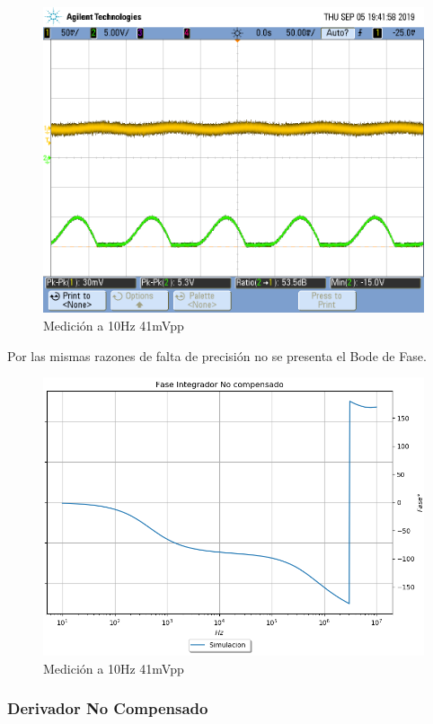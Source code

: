 \documentclass[a4paper]{article}
\begin{document}
\begin{figure}[H]
	\centering
	\includegraphics[width=\textwidth]{Ejercicio4/FOTOS-TP2-TC-EJ4/piso}
	\caption{Medición a 10Hz 41mVpp}
\end{figure}

Por las mismas razones de falta de precisión no se presenta el Bode de Fase.
\begin{figure}[H]
	\centering
	\includegraphics[width=\textwidth]{Ejercicio4/FASE-SIMULADO-INTEGRADOR-NO-COMPENSADO}
	\caption{Medición a 10Hz 41mVpp}
\end{figure}


\subsubsection{Derivador No Compensado}
\end{document}
